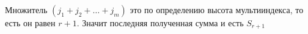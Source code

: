 \begin{prf}
\begin{description}[itemindent=0pt, leftmargin=25pt, labelsep=5pt]
		Множитель $(j_1 + j_2 + \dots + j_m)$ это по определению высота мультииндекса, то есть он равен $r + 1$. Значит последняя полученная сумма и есть $S_{r + 1}$
	\end{description}
\end{prf}\pagebreak %
